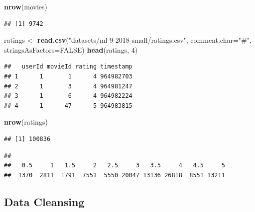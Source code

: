 \documentclass[10pt,b5paper,krantz1]{krantz}
\newenvironment{Shaded}{\begin{snugshade}}{\end{snugshade}}
\newcommand{\DataTypeTok}[1]{\textcolor[rgb]{0.27,0.27,0.27}{#1}}
\newcommand{\DecValTok}[1]{\textcolor[rgb]{0.06,0.06,0.06}{#1}}
\newcommand{\KeywordTok}[1]{\textcolor[rgb]{0.27,0.27,0.27}{\textbf{#1}}}
\newcommand{\NormalTok}[1]{#1}
\newcommand{\OperatorTok}[1]{\textcolor[rgb]{0.43,0.43,0.43}{\textbf{#1}}}
\newcommand{\OtherTok}[1]{\textcolor[rgb]{0.37,0.37,0.37}{#1}}
\newcommand{\StringTok}[1]{\textcolor[rgb]{0.5,0.5,0.5}{#1}}
\begin{document}
\begin{Shaded}
\begin{Highlighting}[]
\KeywordTok{nrow}\NormalTok{(movies)}
\end{Highlighting}
\end{Shaded}

\begin{verbatim}
## [1] 9742
\end{verbatim}

\begin{Shaded}
\begin{Highlighting}[]
\NormalTok{ratings <-}\StringTok{ }\KeywordTok{read.csv}\NormalTok{(}\StringTok{"datasets/ml-9-2018-small/ratings.csv"}\NormalTok{,}
    \DataTypeTok{comment.char=}\StringTok{"#"}\NormalTok{, }\DataTypeTok{stringsAsFactors=}\OtherTok{FALSE}\NormalTok{)}
\KeywordTok{head}\NormalTok{(ratings, }\DecValTok{4}\NormalTok{)}
\end{Highlighting}
\end{Shaded}

\begin{verbatim}
##   userId movieId rating timestamp
## 1      1       1      4 964982703
## 2      1       3      4 964981247
## 3      1       6      4 964982224
## 4      1      47      5 964983815
\end{verbatim}

\begin{Shaded}
\begin{Highlighting}[]
\KeywordTok{nrow}\NormalTok{(ratings)}
\end{Highlighting}
\end{Shaded}

\begin{verbatim}
## [1] 100836
\end{verbatim}

\begin{Shaded}
\end{Shaded}

\begin{verbatim}
## 
##   0.5     1   1.5     2   2.5     3   3.5     4   4.5     5 
##  1370  2811  1791  7551  5550 20047 13136 26818  8551 13211
\end{verbatim}

\hypertarget{data-cleansing}{%
\subsection{Data Cleansing}\label{data-cleansing}}
\end{document}

